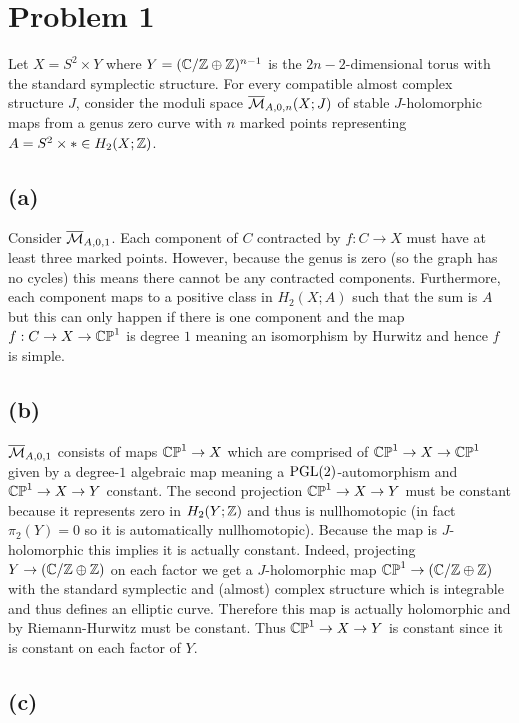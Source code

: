 \documentclass[12pt]{article}
\begin{document}

\section{Problem 1}

Let $X = S^2 \times Y$ where $Y = (\mathbb{C} / \mathbb{Z} \oplus \mathbb{Z})^{n-1}$ is the $2n-2$-dimensional torus with the standard symplectic structure. For every compatible almost complex structure $J$, consider the moduli space $\overline{\mathcal{M}}_{A,0,n}(X;J)$ of stable $J$-holomorphic maps from a genus zero curve with $n$ marked points representing $A = S^2 \times * \in H_2(X; \mathbb{Z})$.

\subsection{(a)}

Consider $\overline{\mathcal{M}}_{A,0,1}$. Each component of $C$ contracted by $f : C \to X$ must have at least three marked points. However, because the genus is zero (so the graph has no cycles) this means there cannot be any contracted components. Furthermore, each component maps to a positive class in $H_2(X; A)$ such that the sum is $A$ but this can only happen if there is one component and the map $f : C \to X \to \mathbb{CP}^1$ is degree $1$ meaning an isomorphism by Hurwitz and hence $f$ is simple.


\subsection{(b)}

$\overline{\mathcal{M}}_{A,0,1}$ consists of maps $\mathbb{CP}^1 \to X$ which are comprised of $\mathbb{CP}^1 \to X \to \mathbb{CP}^1$ given by a degree-$1$ algebraic map meaning a $\mathrm{PGL}(2)$-automorphism and $\mathbb{CP}^1 \to X \to Y$ constant. The second projection $\mathbb{CP}^1 \to X \to Y$ must be constant because it represents zero in $H_2(Y;\mathbb{Z})$ and thus is nullhomotopic (in fact $\pi_2(Y) = 0$ so it is automatically nullhomotopic). Because the map is $J$-holomorphic this implies it is actually constant. Indeed, projecting $Y \to (\mathbb{C} / \mathbb{Z} \oplus \mathbb{Z})$ on each factor we get a $J$-holomorphic map $\mathbb{CP}^1 \to (\mathbb{C} / \mathbb{Z} \oplus \mathbb{Z})$ with the standard symplectic and (almost) complex structure which is integrable and thus defines an elliptic curve. Therefore this map is actually holomorphic and by Riemann-Hurwitz must be constant. Thus $\mathbb{CP}^1 \to X \to Y$ is constant since it is constant on each factor of $Y$. 

\subsection{(c)}
\end{document}
